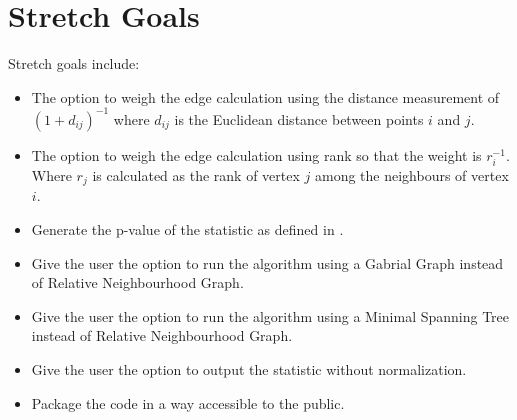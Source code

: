 \documentclass{article}
\begin{document}

\section{Stretch Goals}

Stretch goals include:

\begin{itemize}
\item The option to weigh the edge calculation using the distance measurement of $(1+d_{ij})^{-1}$ where $d_{ij}$ is the Euclidean distance between points $i$ and $j$.
\item The option to weigh the edge calculation using rank so that the weight is $r_i^{-1}$. Where  $r_j$ is calculated as the rank of vertex $j$ among the neighbours of vertex $i$.
\item Generate the p-value of the statistic as defined in \cite{zighed_statistical_2005}.
\item Give the user the option to run the algorithm using a Gabrial Graph instead of Relative Neighbourhood Graph.
\item Give the user the option to run the algorithm using a Minimal Spanning Tree instead of Relative Neighbourhood Graph.
\item Give the user the option to output the statistic without normalization.
\item Package the code in a way accessible to the public.
\end{itemize}




\end{document}
